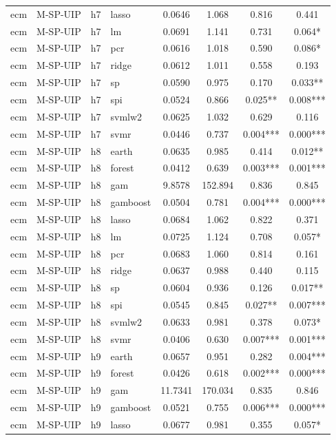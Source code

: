 \begin{ThreePartTable}
\begin{longtable}[t]{llclcccc}
ecm & M-SP-UIP & h7 & lasso & 0.0646 & 1.068 & 0.816 & 0.441\\
ecm & M-SP-UIP & h7 & lm & 0.0691 & 1.141 & 0.731 & 0.064*\\
ecm & M-SP-UIP & h7 & pcr & 0.0616 & 1.018 & 0.590 & 0.086*\\
ecm & M-SP-UIP & h7 & ridge & 0.0612 & 1.011 & 0.558 & 0.193\\
ecm & M-SP-UIP & h7 & sp & 0.0590 & 0.975 & 0.170 & 0.033**\\
ecm & M-SP-UIP & h7 & spi & 0.0524 & 0.866 & 0.025** & 0.008***\\
ecm & M-SP-UIP & h7 & svmlw2 & 0.0625 & 1.032 & 0.629 & 0.116\\
ecm & M-SP-UIP & h7 & svmr & 0.0446 & 0.737 & 0.004*** & 0.000***\\
\addlinespace
ecm & M-SP-UIP & h8 & earth & 0.0635 & 0.985 & 0.414 & 0.012**\\
ecm & M-SP-UIP & h8 & forest & 0.0412 & 0.639 & 0.003*** & 0.001***\\
ecm & M-SP-UIP & h8 & gam & 9.8578 & 152.894 & 0.836 & 0.845\\
ecm & M-SP-UIP & h8 & gamboost & 0.0504 & 0.781 & 0.004*** & 0.000***\\
ecm & M-SP-UIP & h8 & lasso & 0.0684 & 1.062 & 0.822 & 0.371\\
ecm & M-SP-UIP & h8 & lm & 0.0725 & 1.124 & 0.708 & 0.057*\\
ecm & M-SP-UIP & h8 & pcr & 0.0683 & 1.060 & 0.814 & 0.161\\
ecm & M-SP-UIP & h8 & ridge & 0.0637 & 0.988 & 0.440 & 0.115\\
ecm & M-SP-UIP & h8 & sp & 0.0604 & 0.936 & 0.126 & 0.017**\\
ecm & M-SP-UIP & h8 & spi & 0.0545 & 0.845 & 0.027** & 0.007***\\
ecm & M-SP-UIP & h8 & svmlw2 & 0.0633 & 0.981 & 0.378 & 0.073*\\
ecm & M-SP-UIP & h8 & svmr & 0.0406 & 0.630 & 0.007*** & 0.001***\\
\addlinespace
ecm & M-SP-UIP & h9 & earth & 0.0657 & 0.951 & 0.282 & 0.004***\\
ecm & M-SP-UIP & h9 & forest & 0.0426 & 0.618 & 0.002*** & 0.000***\\
ecm & M-SP-UIP & h9 & gam & 11.7341 & 170.034 & 0.835 & 0.846\\
ecm & M-SP-UIP & h9 & gamboost & 0.0521 & 0.755 & 0.006*** & 0.000***\\
ecm & M-SP-UIP & h9 & lasso & 0.0677 & 0.981 & 0.355 & 0.057*\\

\end{longtable}
\end{ThreePartTable}
